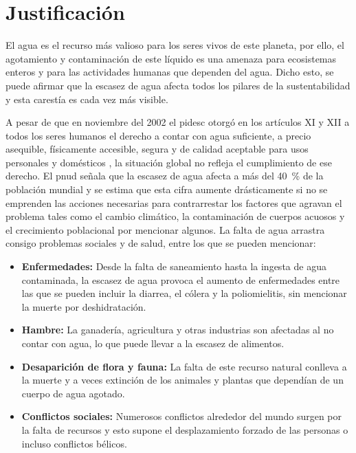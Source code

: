 \chapter{Justificación}

	El agua es el recurso más valioso para los seres vivos de este planeta, por ello, el agotamiento y contaminación de este líquido es una amenaza para ecosistemas enteros y para las actividades humanas que dependen del agua. Dicho esto, se puede afirmar que la escasez de agua afecta todos los pilares de la sustentabilidad y esta carestía es cada vez más visible.
	
	A pesar de que en noviembre del 2002 el \acrfull{pidesc} otorgó en los artículos XI y XII a todos los seres humanos el derecho a contar con agua suficiente, a precio asequible, físicamente accesible, segura y de calidad aceptable para usos personales y domésticos \cite{fondo_para_la_comunicacion_y_la_educacion_ambiental_derecho_nodate}, la situación global no refleja el cumplimiento de ese derecho. El \acrfull{pnud} señala que la escasez de agua afecta a más del \qty{40}{\percent} de la población mundial \cite{pnud_objetivo_nodate} y se estima que esta cifra aumente drásticamente si no se emprenden las acciones necesarias para contrarrestar los factores que agravan el problema tales como el cambio climático, la contaminación de cuerpos acuosos y el crecimiento poblacional por mencionar algunos. La falta de agua arrastra consigo problemas sociales y de salud, entre los que se pueden mencionar:
		
	\begin{itemize}[columns=2]
		\item \textbf{Enfermedades:} Desde la falta de saneamiento hasta la ingesta de agua contaminada, la escasez de agua provoca el aumento de enfermedades entre las que se pueden incluir la diarrea, el cólera y la poliomielitis, sin mencionar la muerte por deshidratación.
		\item \textbf{Hambre:} La ganadería, agricultura y otras industrias son afectadas al no contar con agua, lo que puede llevar a la escasez de alimentos.
		\item \textbf{Desaparición de flora y fauna:} La falta de este recurso natural conlleva a la muerte y a veces extinción de los animales y plantas que dependían de un cuerpo de agua agotado.
		\item \textbf{Conflictos sociales:} Numerosos conflictos alrededor del mundo surgen por la falta de recursos y esto supone el desplazamiento forzado de las personas o incluso conflictos bélicos.
	\end{itemize}
	
